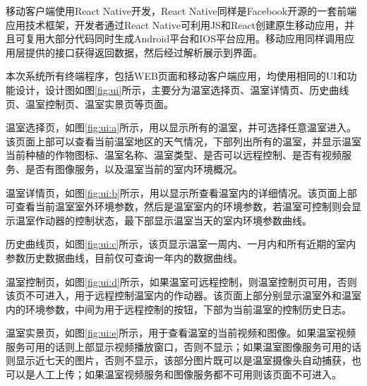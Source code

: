 移动客户端使用React Native开发，React Native同样是Facebook开源的一套前端应用技术框架，开发者通过React Native可利用JS和React创建原生移动应用，并且可复用大部分代码同时生成Android平台和IOS平台应用。移动应用同样调用应用层提供的接口获得返回数据，然后经过解析展示到界面。

	\begin{figure}[!htbp]
		\centering
	\end{figure}
本次系统所有终端程序，包括WEB页面和移动客户端应用，均使用相同的UI和功能设计，设计图如图\ref{fig:ui}所示，主要分为温室选择页、温室详情页、历史曲线页、温室控制页、温室实景页等页面。

温室选择页，如图\ref{fig:ui:a}所示，用以显示所有的温室，并可选择任意温室进入。该页面上部可以查看当前温室地区的天气情况，下部列出所有的温室，并显示温室当前种植的作物图标、温室名称、温室类型、是否可以远程控制、是否有视频服务、是否有图像服务，以及温室当前的室内环境概况。

温室详情页，如图\ref{fig:ui:b}所示，用以显示所查看温室内的详细情况。该页面上部可查看当前温室室外环境参数，然后是温室室内的环境参数，若温室可控制则会显示温室作动器的控制状态，最下部显示温室当天的室内环境参数曲线。

历史曲线页，如图\ref{fig:ui:c}所示，该页显示温室一周内、一月内和所有近期的室内参数历史数据曲线，目前仅可查询一年内的数据曲线。

温室控制页，如图\ref{fig:ui:d}所示，如果温室可远程控制，则温室控制页可用，否则该页不可进入，用于远程控制温室内的作动器。该页面上部分别显示温室外和温室内的环境参数，中间为用于远程控制的按钮，下部为当前温室的控制历史日志。

温室实景页，如图\ref{fig:ui:e}所示，用于查看温室的当前视频和图像。如果温室视频服务可用的话则上部显示视频播放窗口，否则不显示；如果温室图像服务可用的话则显示近七天的图片，否则不显示，该部分图片既可以是温室摄像头自动捕获，也可以是人工上传；如果温室视频服务和图像服务都不可用则该页面不可进入。

